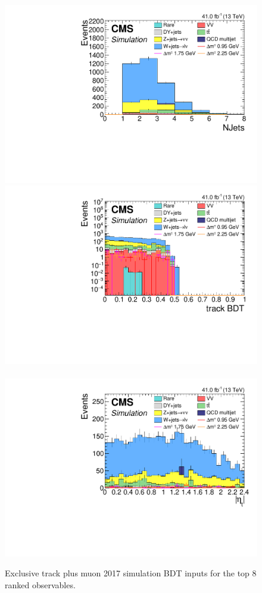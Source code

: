 \begin{figure}[!htb]
\includegraphics[width=0.48\linewidth]{plots/track_muon_bg_signal/none_NJets.pdf} \\
\includegraphics[width=0.48\linewidth]{plots/track_muon_bg_signal/none_trackBDTCorrJetNoMultIso10Dr0.6_log.pdf} \,
\includegraphics[width=0.48\linewidth]{plots/track_muon_bg_signal/none_abs(trackCorrJetNoMultIso10Dr0.6.Eta()).pdf} \\



\caption[Exclusive track plus muon simulation BDT inputs]{Exclusive track plus muon 2017 simulation BDT inputs for the top 8 ranked observables.}
\label{fig:exclusive-track-muon-bdt-sim-inputs}
\end{figure}

